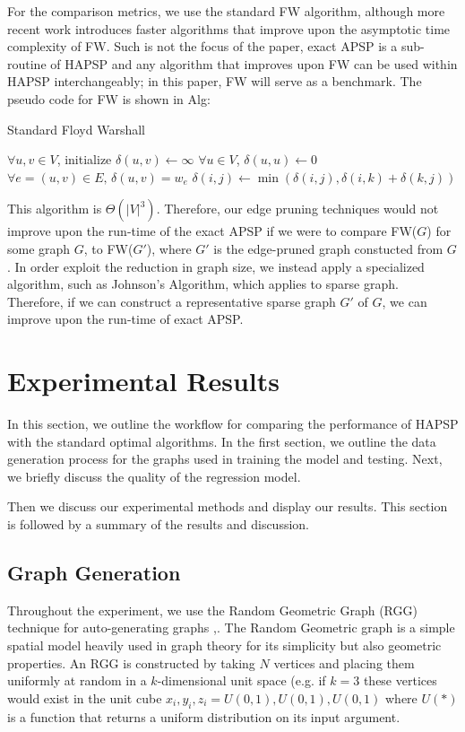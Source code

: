 \documentclass[10.5pt,journal]{IEEEtran}
\begin{document}
	For the comparison metrics, we use the standard FW algorithm, although more recent work
	introduces faster algorithms that improve upon the asymptotic time complexity of FW. Such
	is not the focus of the paper, exact APSP is a sub-routine of HAPSP and any algorithm that
	improves upon FW can be used within HAPSP interchangeably; 
	in this paper, FW will serve as a benchmark. The pseudo code for FW is shown in Alg:\\
	\begin{algorithm}
	\caption{Standard Floyd Warshall}
	\begin{algorithmic}[1]
	\State $\forall u,v \in V$, initialize $\delta(u,v)\leftarrow\infty$
	\State $\forall u \in V$, $\delta(u,u)\leftarrow 0$
	\State $\forall e = (u,v)\in E,\,\delta(u,v) = w_e$
				\State $\delta(i,j) \leftarrow \min(\delta(i,j),\delta(i,k)+\delta(k,j))$
			\EndFor
		\EndFor
	\EndFor
	\end{algorithmic}
	\label{fig:alg2}
	\end{algorithm}
	
	This algorithm is $\Theta(|V|^3)$. Therefore, our edge pruning techniques would not improve upon
	the run-time of the exact APSP if we were to compare FW($G$) for some graph $G$, to FW($G'$),
	where $G'$ is the edge-pruned graph constucted from $G$. In order exploit the reduction in graph
	size, we instead apply a specialized algorithm, such as Johnson's Algorithm, which applies to
	sparse graph. Therefore, if we can construct a representative sparse graph $G'$ of $G$,
	we can improve upon the run-time of exact APSP.\\
	
\section{Experimental Results}
	In this section, we outline the workflow for comparing the performance of HAPSP with the
	standard optimal algorithms. In the first section, we outline the data generation process
	for the graphs used in training the model and testing. Next, we briefly discuss the quality
	of the regression model.
	
	Then we discuss our experimental methods and display our results. This section is followed by
	a summary of the results and discussion.
	\subsection{Graph Generation}
		Throughout the experiment, we use the Random Geometric Graph (RGG) technique for auto-generating graphs
		\cite{randGeom},\cite{randGeom2}.
		The Random Geometric graph is a simple spatial model heavily used in graph theory for its simplicity
		but also geometric properties. An RGG is constructed by taking $N$ vertices and placing them
		uniformly at random in a $k$-dimensional unit space (e.g. if $k=3$ these vertices would exist in
		the unit cube $x_i,y_i,z_i = U(0,1),U(0,1),U(0,1)$ where $U(*)$ is a function that returns a uniform
		distribution on its input argument.\\
		
\end{document}
